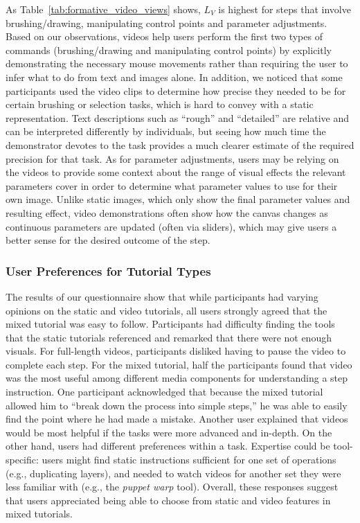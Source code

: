As Table~\ref{tab:formative_video_views} shows, $L_V$ is highest for steps that involve brushing/drawing, manipulating control points and parameter adjustments. Based on our observations, videos help users perform the first two types of commands (brushing/drawing and manipulating control points) by explicitly demonstrating the necessary mouse movements rather than requiring the user to infer what to do from text and images alone. In addition, we noticed that some participants used the video clips to determine how precise they needed to be for certain brushing or selection tasks, which is hard to convey with a static representation. Text descriptions such as ``rough'' and ``detailed'' are relative and can be interpreted differently by individuals, but seeing how much time the demonstrator devotes to the task provides a much clearer estimate of the required precision for that task. As for parameter adjustments, users may be relying on the videos to provide some context about the range of visual effects the relevant parameters cover in order to determine what parameter values to use for their own image. Unlike static images, which only show the final parameter values and resulting effect, video demonstrations often show how the canvas changes as continuous parameters are updated (often via sliders), which may give users a better sense for the desired outcome of the step.

\subsubsection{User Preferences for Tutorial Types}
The results of our questionnaire show that while participants had varying opinions on the static and video tutorials, all users strongly agreed that the mixed tutorial was easy to follow. Participants had difficulty finding the tools that the static tutorials referenced and remarked that there were not enough visuals. For full-length videos, participants disliked having to pause the video to complete each step. For the mixed tutorial, half the participants found that video was the most useful among different media components for understanding a step instruction. One participant acknowledged that because the mixed tutorial allowed him to “break down the process into simple steps,” he was able to easily find the point where he had made a mistake. Another user explained that videos would be most helpful if the tasks were more advanced and in-depth. On the other hand, users had different preferences within a task. Expertise could be tool-specific: users might find static instructions sufficient for one set of operations (e.g., duplicating layers), and needed to watch videos for another set they were less familiar with (e.g., the \emph{puppet warp} tool). Overall, these responses suggest that users appreciated being able to choose from static and video features in mixed tutorials.


